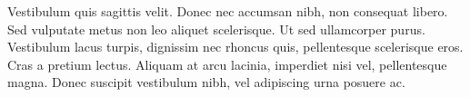 Vestibulum quis sagittis velit. Donec nec accumsan nibh, non consequat libero. Sed vulputate metus non leo aliquet scelerisque. Ut sed ullamcorper purus. Vestibulum lacus turpis, dignissim nec rhoncus quis, pellentesque scelerisque eros. Cras a pretium lectus. Aliquam at arcu lacinia, imperdiet nisi vel, pellentesque magna. Donec suscipit vestibulum nibh, vel adipiscing urna posuere ac.